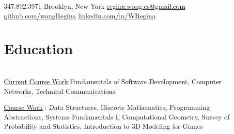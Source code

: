 \documentclass[]{deedy-resume-openfont}
\begin{document}
%
%
\lastupdated

%
%

{ \faMobilePhone \hspace{0.1 in} 347.892.3971}
{ \faMapMarker \hspace{0.1 in}Brooklyn, New York}
{\href{mailto:regina.wong.cs@gmail.com}{ \faEnvelopeSquare \hspace{0.1 in} regina.wong.cs@gmail.com}}
{ \href{https://github.com/wongRegina}{\faGithubSquare\hspace{0.1 in} github.com/wongRegina}}
{\href{https://www.linkedin.com/in/wregina}{ \faLinkedinSquare \hspace{0.1 in} linkedin.com/in/WRegina}}
\section{Education}

\\

\hspace{0.1 in} \underline{{Current Course Work}}:Fundamentals of Software Development, Computer Networks, Technical Communications

\hspace{0.1 in} \underline{{Course Work}} :  Data Structures, Discrete Mathematics, Programming Abstractions, Systems Fundamentals I, Computational Geometry, Survey of Probability and Statistics, Introduction to 3D Modeling for Games
\sectionsep
\hline
\end{document}
